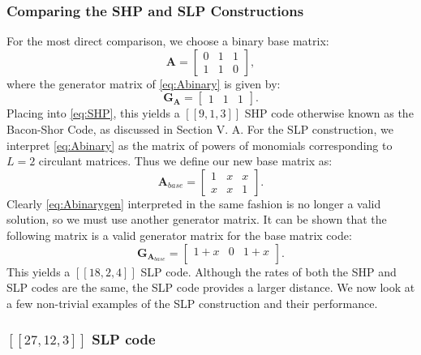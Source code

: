 \documentclass[conference]{IEEEtran}
\newcommand{\llbr}{[\![}
\newcommand{\rrbr}{]\!]}
\begin{document}
\subsubsection{Comparing the SHP and SLP Constructions}
For the most direct comparison, we choose a binary base matrix:
\begin{equation} 
\label{eq:Abinary} 
\boldsymbol{A}=
\begin{bmatrix}
    0&1&1\\
    1&1&0
\end{bmatrix},
\end{equation}
where the generator matrix of \eqref{eq:Abinary} is given by:
\begin{equation} 
\label{eq:Abinarygen}
\boldsymbol{G}_{\boldsymbol{A}}=
\begin{bmatrix}
    1&1&1
\end{bmatrix}.
\end{equation}
Placing into \eqref{eq:SHP}, this yields a $\llbr 9,1,3 \rrbr$ SHP code otherwise known as the Bacon-Shor Code, as discussed in Section V. A. For the SLP construction, we interpret \eqref{eq:Abinary} as the matrix of powers of monomials corresponding to $L=2$ circulant matrices. Thus we define our new base matrix as:
\begin{equation} 
\label{eq:Acirc} 
\boldsymbol{A}_{base}=
\begin{bmatrix}
    1&x&x\\
    x&x&1
\end{bmatrix}.
\end{equation}
Clearly \eqref{eq:Abinarygen} interpreted in the same fashion is no longer a valid solution, so we must use another generator matrix. It can be shown that the following matrix is a valid generator matrix for the base matrix code:
\begin{equation} 
\label{eq:Acirc} 
\boldsymbol{G}_{\boldsymbol{A}_{base}}=
\begin{bmatrix}
    1+x&0&1+x\\
\end{bmatrix}.
\end{equation}
This yields a  $\llbr 18,2,4 \rrbr$ SLP code. Although the rates of both the SHP and SLP codes are the same, the SLP code provides a larger distance. 
We now look at a few non-trivial examples of the SLP construction and their performance.

\subsubsection{$\llbr 27,12,3 \rrbr$ SLP code}
\end{document}
